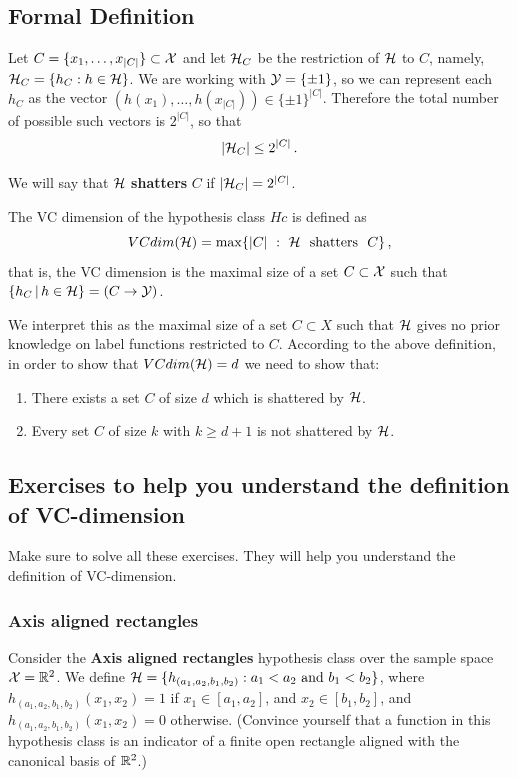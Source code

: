 {\subsection{Formal Definition}

Let $C = \{x_1,\ldots,x_{|C|}\} \subset \mathcal{X}$ and let $\mathcal{H}_C$ be the restriction of $\mathcal{H}$ to $C$, namely,
$\mathcal{H}_C = \{ h_C : h \in \mathcal{H}\}$.
We are working with $\mathcal{Y}=\{\pm 1\}$, so we can represent each $h_C$ as the vector $(h(x_1),\ldots,h(x_{|C|})) \in \{\pm 1\}^{|C|}$. Therefore the total number of possible such vectors is $2^{|C|}$, so that
$$|\mathcal{H}_C| \le 2^{|C|}\,.$$

We will say that $\mathcal{H}$ \textbf{shatters} $C$ if $|\mathcal{H}_C| =  2^{|C|}$.  
\begin{definition}
	The VC dimension of the hypothesis class $Hc$ is defined as 
	$$VCdim(\mathcal{H}) = \max\{ |C| ~:~ \mathcal{H}~\,\,\textrm{shatters}~\,\,C \}\,,$$
	that is, the VC dimension is the maximal size of a set $C\subset \mathcal{X}$ such that $\{h_C\,|\,h\in\mathcal{H}\} = (C\to\mathcal{Y})$.
\end{definition}
We interpret this as the maximal size of a set $C\subset X$ such that 
$\mathcal{H}$ gives no prior knowledge on label functions restricted to $C$.
%
\vspace{3mm}
According to the above definition, in order to show that $VCdim(\mathcal{H}) = d$ we need to show that:
\begin{enumerate}
	\item There exists a set $C$ of size $d$ which is shattered by $\mathcal{H}$.
	\item Every set $C$ of size $k$ with $k\geq d+1$ is not shattered by $\mathcal{H}$.
\end{enumerate}

\subsection{Exercises to help you understand the definition of VC-dimension}

Make sure to solve all these exercises. They will help you understand the
definition of VC-dimension.

\subsubsection{Axis aligned rectangles}
Consider the \textbf{Axis aligned rectangles} hypothesis class over the sample space 
$\mathcal{X} = \mathbb{R} ^2$. We define $\mathcal{H} = \{h_{(a_1,  a_2, b_1 , b_2)}: a_1 < a_2 ~\text{and}~  b_1 < b_2 \}$, 
where $ h_{(a_1, a_2, b_1 , b_2)}(x_1,x_2) = 1$ if $x_1 \in [a_1,a_2]$, and $x_2 \in [b_1,b_2]$, and  $ h_{(a_1, a_2, b_1 , b_2)}(x_1,x_2) = 0$ otherwise. (Convince yourself that a function in this hypothesis class is an indicator of a finite open rectangle aligned with the canonical basis of $\mathbb{R} ^2$.)

}
